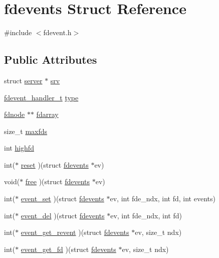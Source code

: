 \hypertarget{structfdevents}{\section{fdevents Struct Reference}
\label{structfdevents}
}


{\ttfamily \#include $<$fdevent.\-h$>$}

\subsection*{Public Attributes}
\begin{DoxyCompactItemize}
\item 
struct \hyperlink{structserver}{server} $\ast$ \hyperlink{structfdevents_a602f2ca1c249c833a4ecb0fc2bf00d31}{srv}
\item 
\hyperlink{fdevent_8h_a7a31a5c15ba485676406291b6298e9a1}{fdevent\-\_\-handler\-\_\-t} \hyperlink{structfdevents_a9656b863d74046158c2feddd57b46f01}{type}
\item 
\hyperlink{fdevent_8h_af5298a6dd5999718aa2721646fe31949}{fdnode} $\ast$$\ast$ \hyperlink{structfdevents_afaf0c3caf9df8add00421fc912e78ad1}{fdarray}
\item 
size\-\_\-t \hyperlink{structfdevents_a02f9df92b0ad5e0c79c36fdb1bc8d0a5}{maxfds}
\item 
int \hyperlink{structfdevents_a93aa999f3be50e2b4316e8a908d78e4c}{highfd}
\item 
int($\ast$ \hyperlink{structfdevents_a7b407184007244be141f57003a576fa0}{reset} )(struct \hyperlink{structfdevents}{fdevents} $\ast$ev)
\item 
void($\ast$ \hyperlink{structfdevents_aad6d8902685c90b08a721c508cb21a8a}{free} )(struct \hyperlink{structfdevents}{fdevents} $\ast$ev)
\item 
int($\ast$ \hyperlink{structfdevents_ad23c2b0f981da7d7efd43c48bf65d4d6}{event\-\_\-set} )(struct \hyperlink{structfdevents}{fdevents} $\ast$ev, int fde\-\_\-ndx, int fd, int events)
\item 
int($\ast$ \hyperlink{structfdevents_a3e6ae7d853075a8da89681224993234f}{event\-\_\-del} )(struct \hyperlink{structfdevents}{fdevents} $\ast$ev, int fde\-\_\-ndx, int fd)
\item 
int($\ast$ \hyperlink{structfdevents_a88f6a7540f1fc6703a21bc02db3ff261}{event\-\_\-get\-\_\-revent} )(struct \hyperlink{structfdevents}{fdevents} $\ast$ev, size\-\_\-t ndx)
\item 
int($\ast$ \hyperlink{structfdevents_a4be15b07795f319d7a52eed6020e20b9}{event\-\_\-get\-\_\-fd} )(struct \hyperlink{structfdevents}{fdevents} $\ast$ev, size\-\_\-t ndx)
$$
\end{DoxyCompactItemize}
